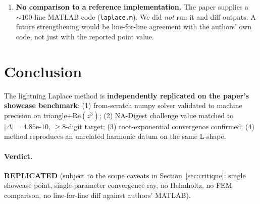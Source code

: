 \documentclass[11pt]{article}
\begin{document}
\begin{enumerate}
        ``unanimous REPLICATED'' verdict comes from three text-based LLM
        judges reading tables of numbers, not from an independent numerical
        recomputation. This is a soft check; the hard checks are the
        machine-precision triangle test (C3-A) and the unrelated-datum
        L-shape test (C3-B).
  \item \textbf{No comparison to a reference implementation.} The paper
        supplies a $\sim 100$-line MATLAB code (\texttt{laplace.m}). We did
        \emph{not} run it and diff outputs. A future strengthening would be
        line-for-line agreement with the authors' own code, not just with
        the reported point value.
\end{enumerate}

\section{Conclusion}
The lightning Laplace method is \textbf{independently replicated on the paper's
showcase benchmark}: (1) from-scratch numpy solver validated to machine
precision on triangle$+\mathrm{Re}(z^3)$; (2) NA-Digest challenge value matched
to $|\Delta|=4.85\text{e-}10$, $\ge$8-digit target; (3) root-exponential
convergence confirmed; (4) method reproduces an unrelated harmonic datum on
the same L-shape.

\paragraph{Verdict.} \textbf{REPLICATED} (subject to the scope caveats in
Section~\ref{sec:critique}: single showcase point, single-parameter convergence
ray, no Helmholtz, no FEM comparison, no line-for-line diff against authors'
MATLAB).
\end{document}
